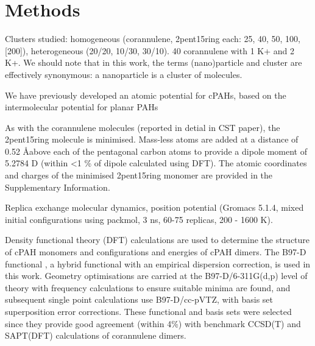 



\section{Methods}
Clusters studied: homogeneous (corannulene, 2pent15ring each: 25, 40, 50, 100, [200]), heterogeneous (20/20, 10/30, 30/10).
40 corannulene with 1 K+ and 2 K+.
We should note that in this work, the terms (nano)particle and cluster are effectively synonymous: a nanoparticle is a cluster of molecules.

We have previously developed an atomic potential for cPAHs, based on the intermolecular potential for planar PAHs 

As with the corannulene molecules (reported in detial in CST paper), the 2pent15ring molecule is minimised. Mass-less atoms are added at a distance of 0.52 \AA above each of the pentagonal carbon atoms to provide a dipole moment of 5.2784 D (within <1 \% of dipole calculated using DFT). The atomic coordinates and charges of the minimised 2pent15ring monomer are provided in the Supplementary Information.


Replica exchange molecular dynamics, position potential (Gromacs 5.1.4, mixed initial configurations using packmol, 3 ns, 60-75 replicas, 200 - 1600 K).


Density functional theory (DFT) calculations are used to determine the structure of cPAH monomers and configurations and energies of cPAH dimers. The B97-D functional \cite{grimme2006semiempirical}, a hybrid functional with an empirical dispersion correction, is used in this work.  Geometry optimisations are carried at the B97-D/6-311G(d,p) level of theory with frequency calculations to ensure suitable minima are found, and subsequent single point calculations use B97-D/cc-pVTZ, with basis set superposition error corrections.  These functional and basis sets were selected since they provide good agreement (within 4\%) with benchmark CCSD(T) \cite{janowski2011convex} and SAPT(DFT) \cite{Cabaleiro-Lago2018} calculations of corannulene dimers. %


